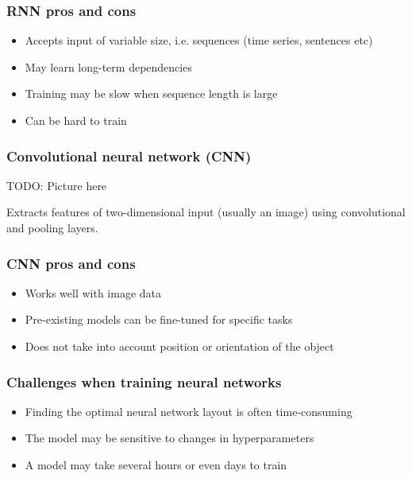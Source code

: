 \documentclass{beamer}
\newcommand\pro{\item[$+$]}
\newcommand\con{\item[$-$]}
\begin{document}
  \begin{frame}
    \frametitle{RNN pros and cons}  
    
   	\begin{itemize}
		\pro Accepts input of variable size, i.e. sequences (time series, sentences etc)
		\pro May learn long-term dependencies
		\con Training may be slow when sequence length is large
		\con Can be hard to train
	\end{itemize}
  \end{frame}    

  \begin{frame}
    \frametitle{Convolutional neural network (CNN)}  
    
	TODO: Picture here    

  Extracts features of two-dimensional input (usually an image) using convolutional and pooling layers.

  \end{frame}  
  
  \begin{frame}
    \frametitle{CNN pros and cons}  
    
   	\begin{itemize}
		\pro Works well with image data
		\con Pre-existing models can be fine-tuned for specific tasks
		\con Does not take into account position or orientation of the object
	\end{itemize}
  \end{frame}    

  \begin{frame}
    \frametitle{Challenges when training neural networks}  
    
   	\begin{itemize}
		\item Finding the optimal neural network layout is often time-consuming
		\item The model may be sensitive to changes in hyperparameters
		\item A model may take several hours or even days to train
	\end{itemize}
  \end{frame}  
\end{document}
